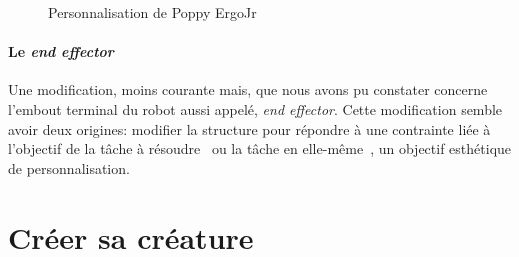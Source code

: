 \begin{figure}[!h]
\begin{minipage}{0.3\linewidth}
            \label{fig:ergo-sorus}
        \end{minipage}
        \hfill
        \caption{Personnalisation de Poppy ErgoJr}
        \end{figure}{}
        \paragraph{Le \textit{end effector}} 
            Une modification, moins courante mais, que nous avons pu constater concerne l'embout terminal du robot aussi appelé, \textit{end effector}. Cette modification semble avoir deux origines: \Li modifier la structure pour répondre à une contrainte liée à l'objectif de la tâche à résoudre~ ou la tâche en elle-même~, \ii un objectif esthétique de personnalisation.
\section{Créer sa créature}

